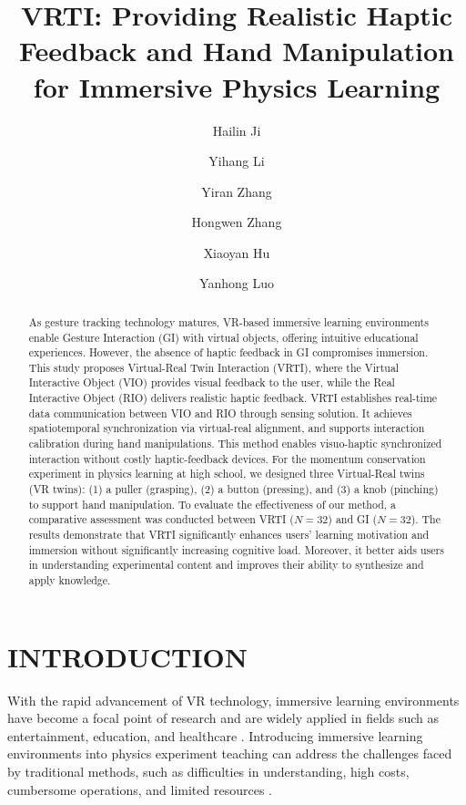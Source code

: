 \documentclass[runningheads]{llncs}
\begin{document}
\title{VRTI: Providing Realistic Haptic Feedback and Hand Manipulation for Immersive Physics Learning}

\author{Hailin Ji \and 
Yihang Li \and 
Yiran Zhang \and 
Hongwen Zhang \and 
Xiaoyan Hu \and 
Yanhong Luo}
 


\maketitle

\begin{abstract}
As gesture tracking technology matures, VR-based immersive learning environments enable Gesture Interaction (GI) with virtual objects, offering intuitive educational experiences. However, the absence of haptic feedback in GI compromises immersion. This study proposes Virtual-Real Twin Interaction (VRTI), where the Virtual Interactive Object (VIO) provides visual feedback to the user, while the Real Interactive Object (RIO) delivers realistic haptic feedback. VRTI establishes real-time data communication between VIO and RIO through sensing solution. It achieves spatiotemporal synchronization via virtual-real alignment, and supports interaction calibration during hand manipulations. This method enables visuo-haptic synchronized interaction without costly haptic-feedback devices. For the momentum conservation experiment in physics learning at high school, we designed three Virtual-Real twins (VR twins): (1) a puller (grasping), (2) a button (pressing), and (3) a knob (pinching) to support hand manipulation. To evaluate the effectiveness of our method, a comparative assessment was conducted between VRTI ($N=32$) and GI ($N=32$). The results demonstrate that VRTI significantly enhances users' learning motivation and immersion without significantly increasing cognitive load. Moreover, it better aids users in understanding experimental content and improves their ability to synthesize and apply knowledge.

\end{abstract}

\section{INTRODUCTION}
With the rapid advancement of VR technology, immersive learning environments have become a focal point of research and are widely applied in fields such as entertainment, education, and healthcare \cite{luo2020dream,yeung2021virtual}. Introducing immersive learning environments into physics experiment teaching can address the challenges faced by traditional methods, such as difficulties in understanding, high costs, cumbersome operations, and limited resources \cite{yang2007impact,abu2018design}.
\end{document}
